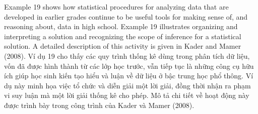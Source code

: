 \documentclass[
  10pt,
  a4paper,
  landscape,
  twoside,
  openany
]{scrbook}
\newcommand{\EN}[1]{#1}
\newcommand{\VI}[1]{#1}
\newcommand{\NOTE}[1]{#1}
\begin{document}
\TriPara
{
\EN{Example 19 shows how statistical procedures for analyzing data that are developed in earlier grades continue to be useful tools for making sense of, and reasoning about, data in high school. Example 19 illustrates organizing and interpreting a solution and recognizing the scope of inference for a statistical solution. A detailed description of this activity is given in Kader and Mamer
(2008).}
}
{
\VI{Ví dụ 19 cho thấy các quy trình thống kê dùng trong phân tích dữ liệu, vốn đã được hình thành từ các lớp học trước, vẫn tiếp tục là những công cụ hữu ích giúp học sinh kiến tạo hiểu và luận về dữ liệu ở bậc trung học phổ thông. Ví dụ này minh họa việc tổ chức và diễn giải một lời giải, đồng thời nhận ra phạm vi suy luận mà một lời giải thống kê cho phép. Mô tả chi tiết về hoạt động này được trình bày trong công trình của Kader và Mamer (2008).}
}
{
\NOTE{}
}
\end{document}

